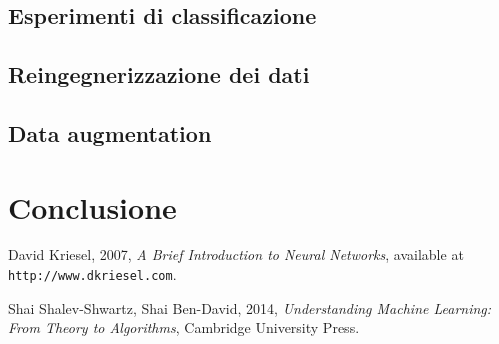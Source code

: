 \documentclass[12pt, twoside, letterpaper]{report}
\begin{document}
		\section{Esperimenti di classificazione}
		\section{Reingegnerizzazione dei dati}
		\section{Data augmentation}

	\chapter*{Conclusione}	
	
	\begin{thebibliography}{9}
		 David Kriesel, 2007, \textit{A Brief Introduction to Neural Networks}, available at \texttt{http://www.dkriesel.com}.

		 Shai Shalev-Shwartz, Shai Ben-David, 2014, \textit{Understanding Machine Learning: From Theory to Algorithms}, Cambridge University Press.

	\end{thebibliography}
	
\end{document}

